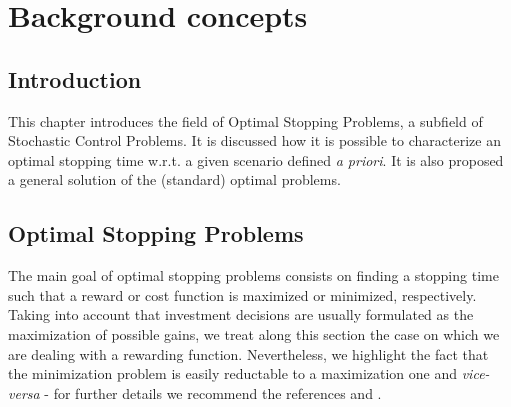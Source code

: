 \chapter{Background concepts}
\label{chapter:bc}

\section{Introduction}




This chapter introduces the field of Optimal Stopping Problems, a subfield of Stochastic Control Problems. It is discussed how it is possible to characterize an optimal stopping time w.r.t. a given scenario defined \textit{a priori}. It is also proposed a general solution of the (standard) optimal problems.



\section{Optimal Stopping Problems}
\label{section:osp}

The main goal of optimal stopping problems consists on finding a stopping time such that a reward or cost function is maximized or minimized, respectively. Taking into account that investment decisions are usually formulated as the maximization of possible gains, we treat along this section the case on which we are dealing with a rewarding function. Nevertheless, we highlight the fact that the minimization problem is easily reductable to a maximization one and \textit{vice-versa} - for further details we recommend the references \cite{ross} and \cite{oksendal:book}.

